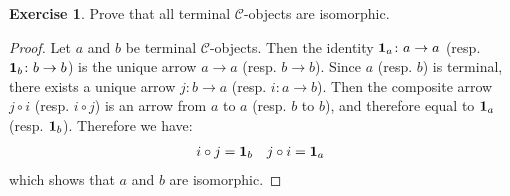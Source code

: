 \documentclass[11pt,a4paper,twoside]{article}
\newcommand{\aname}[1]{{\normalfont\textbf{#1}}}
\newcommand{\Id}{\aname{1}}
\theoremstyle{definition}
\newcounter{excounter}
\newtheorem{exercise}[excounter]{Exercise}
\begin{document}
\begin{exercise}

  Prove that all terminal $\mathscr{C}$-objects are isomorphic.

\end{exercise}

\begin{proof}

  Let $a$ and $b$ be terminal $\mathscr{C}$-objects. Then the identity $\Id_a \colon a \to a$ (resp. $\Id_b \colon b \to b$) is the unique arrow $a \to a$ (resp. $b \to b$).
  Since $a$ (resp. $b$) is terminal, there exists a unique arrow $j \colon b \to a$ (resp. $i \colon a \to b$). Then the composite arrow $j \circ i$ (resp. $i \circ j$) is an arrow from $a$ to $a$ (resp. $b$ to $b$), and therefore equal to $\Id_a$ (resp. $\Id_b$). Therefore we have:
  \begin{align*}
    i \circ j = \Id_b && j \circ i = \Id_a
  \end{align*}
  which shows that $a$ and $b$ are isomorphic.

\end{proof}
\end{document}
